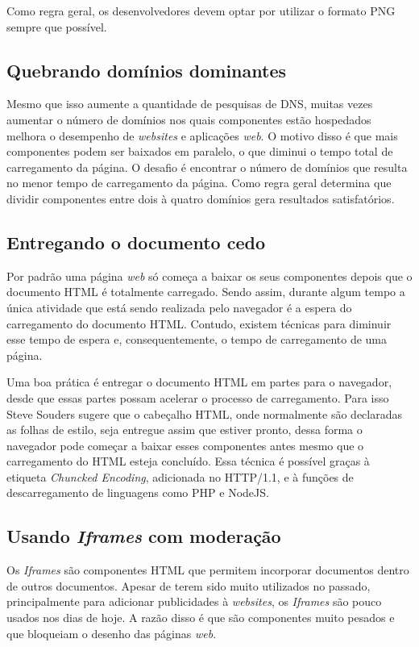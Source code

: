 Como regra geral, os desenvolvedores devem optar por utilizar o formato PNG sempre que possível.

\subsection{Quebrando domínios dominantes}
\label{subsec:evenfaster_cap11}
Mesmo que isso aumente a quantidade de pesquisas de DNS, muitas vezes aumentar o número de domínios nos quais componentes estão hospedados melhora o desempenho de \textit{websites} e aplicações \textit{web}. O motivo disso é que mais componentes podem ser baixados em paralelo, o que diminui o tempo total de carregamento da página. O desafio é encontrar o número de domínios que resulta no menor tempo de carregamento da página. Como regra geral \cite[p.~168]{EvenFaster} determina que dividir componentes entre dois à quatro domínios gera resultados satisfatórios.

\subsection{Entregando o documento cedo}
\label{subsec:evenfaster_cap12}
Por padrão uma página \textit{web} só começa a baixar os seus componentes depois que o documento HTML é totalmente carregado. Sendo assim, durante algum tempo a única atividade que está sendo realizada pelo navegador é a espera do carregamento do documento HTML. Contudo, existem técnicas para diminuir esse tempo de espera e, consequentemente, o tempo de carregamento de uma página.

Uma boa prática é entregar o documento HTML em partes para o navegador, desde que essas partes possam acelerar o processo de carregamento. Para isso Steve Souders sugere que o cabeçalho HTML, onde normalmente são declaradas as folhas de estilo, seja entregue assim que estiver pronto, dessa forma o navegador pode começar a baixar esses componentes antes mesmo que o carregamento do HTML esteja concluído. Essa técnica é possível graças à etiqueta \textit{Chuncked Encoding}, adicionada no HTTP/1.1, e à funções de descarregamento de linguagens como PHP e NodeJS.

\subsection{Usando \textit{Iframes} com moderação}
\label{subsec:evenfaster_cap13}
Os \textit{Iframes} são componentes HTML que permitem incorporar documentos dentro de outros documentos. Apesar de terem sido muito utilizados no passado, principalmente para adicionar publicidades à \textit{websites}, os \textit{Iframes} são pouco usados nos dias de hoje. A razão disso é que são componentes muito pesados e que bloqueiam o desenho das páginas \textit{web}.

